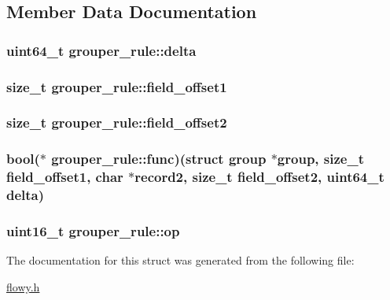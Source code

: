 \subsection{\-Member \-Data \-Documentation}
\hypertarget{structgrouper__rule_a5cfd512aa4238698edebde1fc322d2bf}{
\subsubsection[{delta}]{\setlength{\rightskip}{0pt plus 5cm}uint64\-\_\-t {\bf grouper\-\_\-rule\-::delta}}}\label{structgrouper__rule_a5cfd512aa4238698edebde1fc322d2bf}
\hypertarget{structgrouper__rule_a5ff78535dda1b91d4f54c6fc55cdf979}{
\subsubsection[{field\-\_\-offset1}]{\setlength{\rightskip}{0pt plus 5cm}size\-\_\-t {\bf grouper\-\_\-rule\-::field\-\_\-offset1}}}\label{structgrouper__rule_a5ff78535dda1b91d4f54c6fc55cdf979}
\hypertarget{structgrouper__rule_a949e21775eafc77f3785fd934e72d330}{
\subsubsection[{field\-\_\-offset2}]{\setlength{\rightskip}{0pt plus 5cm}size\-\_\-t {\bf grouper\-\_\-rule\-::field\-\_\-offset2}}}\label{structgrouper__rule_a949e21775eafc77f3785fd934e72d330}
\hypertarget{structgrouper__rule_a062edda43f48c3491339ebceae48a899}{
\subsubsection[{func}]{\setlength{\rightskip}{0pt plus 5cm}bool($\ast$ {\bf grouper\-\_\-rule\-::func})(struct {\bf group} $\ast${\bf group}, size\-\_\-t {\bf field\-\_\-offset1}, char $\ast$record2, size\-\_\-t {\bf field\-\_\-offset2}, uint64\-\_\-t {\bf delta})}}\label{structgrouper__rule_a062edda43f48c3491339ebceae48a899}
\hypertarget{structgrouper__rule_a1b4321526398f84c13b8c9206a64f84a}{
\subsubsection[{op}]{\setlength{\rightskip}{0pt plus 5cm}uint16\-\_\-t {\bf grouper\-\_\-rule\-::op}}}\label{structgrouper__rule_a1b4321526398f84c13b8c9206a64f84a}


\-The documentation for this struct was generated from the following file\-:\begin{DoxyCompactItemize}
\item 
\hyperlink{flowy_8h}{flowy.\-h}\end{DoxyCompactItemize}
